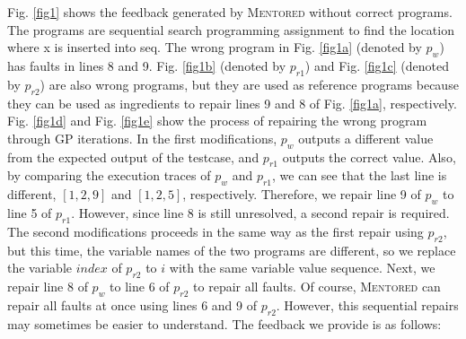 \documentclass[10pt,conference]{IEEEtran}
\begin{document}
        Fig. \ref{fig1} shows the feedback generated by \textsc{Mentored} without correct programs. The programs are sequential search programming assignment to find the location where x is inserted into seq. The wrong program in Fig. \ref{fig1a} (denoted by $p_{w}$) has faults in lines 8 and 9. Fig. \ref{fig1b} (denoted by $p_{r1}$) and Fig. \ref{fig1c} (denoted by $p_{r2}$) are also wrong programs, but they are used as reference programs because they can be used as ingredients to repair lines 9 and 8 of Fig. \ref{fig1a}, respectively. Fig. \ref{fig1d} and Fig. \ref{fig1e} show the process of repairing the wrong program through GP iterations. In the first modifications, $p_{w}$ outputs a different value from the expected output of the testcase, and $p_{r1}$ outputs the correct value. Also, by comparing the execution traces of $p_{w}$ and $p_{r1}$, we can see that the last line is different, $[1,2,9]$ and $[1,2,5]$, respectively. Therefore, we repair line 9 of $p_{w}$ to line 5 of $p_{r1}$. However, since line 8 is still unresolved, a second repair is required. The second modifications proceeds in the same way as the first repair using $p_{r2}$, but this time, the variable names of the two programs are different, so we replace the variable $index$ of $p_{r2}$ to $i$ with the same variable value sequence. Next, we repair line 8 of $p_{w}$ to line 6 of $p_{r2}$ to repair all faults. Of course, \textsc{Mentored} can repair all faults at once using lines 6 and 9 of $p_{r2}$. However, this sequential repairs may sometimes be easier to understand. The feedback we provide is as follows:
\end{document}
